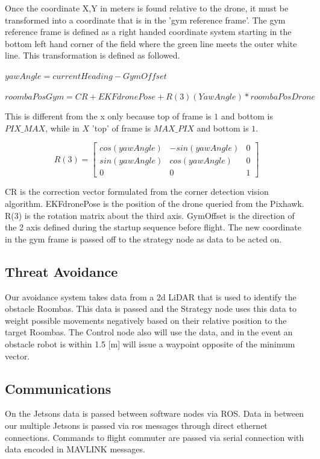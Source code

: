 \documentclass[12pt,letterpaper]{article}
\begin{document}
		Once the coordinate X,Y in meters is found relative to the drone, it must be transformed into a coordinate that is in the 'gym reference frame'. The gym reference frame is defined as a right handed coordinate system starting in the bottom left hand corner of the field where the green line meets the outer white line. This transformation is defined as followed.

		\begin{center}
			$yawAngle = currentHeading - GymOffset$
		\end{center}
		\begin{center}
			$roombaPosGym = CR + EKFdronePose + R(3)(YawAngle)*roombaPosDrone$
		\end{center}


		This is different from the x only because top of frame is $1$ and bottom is $PIX\_MAX$, while in $X$ 'top' of frame is $MAX\_PIX$ and bottom is $1$. 

		\[
		R(3) =
			\begin{bmatrix}
			cos(yawAngle) & -sin(yawAngle) & 0 \\
			sin(yawAngle) & cos(yawAngle)  & 0 \\
			0 & 0 & 1
			\end{bmatrix}
		\]

		CR is the correction vector formulated from the corner detection vision algorithm. EKFdronePose is the position of the drone queried from the Pixhawk. R(3) is the rotation matrix about the third axis. GymOffset is the direction of the 2 axis defined during the startup sequence before flight. The new coordinate in the gym frame is passed off to the strategy node as data to be acted on.
	\subsection*{Threat Avoidance}
		Our avoidance system takes data from a 2d LiDAR that is used to identify the obstacle Roombas. This data is passed and the Strategy node uses this data to weight possible movements negatively based on their relative position to the target Roombas. The Control node also will use the data, and in the event an obstacle robot is within 1.5 [m] will issue a waypoint opposite of the minimum vector.

	\subsection*{Communications}
		On the Jetsons data is passed between software nodes via ROS. Data in between our multiple Jetsons is passed via ros messages through direct ethernet connections. Commands to flight commuter are passed via serial connection with data encoded in MAVLINK messages.
\end{document}
